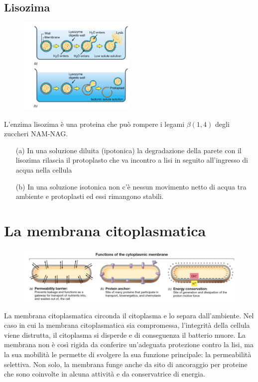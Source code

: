 \subsection{Lisozima}
\begin{multicols}{2}
\begin{figure}[H]
	\includegraphics[width=0.5\textwidth]{Pictures/7.png}
\end{figure} 
L’enzima lisozima è una proteina che può rompere i legami $\beta(1, 4)$ degli zuccheri NAM-NAG.
\begin{itemize}
\item[(a)] In una soluzione diluita (ipotonica) la degradazione della parete con il lisozima rilascia il protoplasto che va incontro a lisi in seguito 
all’ingresso di acqua nella cellula
\item[(b)] In una soluzione isotonica non c’è nessun movimento netto di acqua tra ambiente e protoplasti ed essi rimangono stabili.
\end{itemize}
\end{multicols}
\section{La membrana citoplasmatica}
\begin{figure}[H]
	\includegraphics[width=\textwidth]{Pictures/8.png}
\end{figure}
La membrana citoplasmatica circonda il citoplasma e lo separa dall’ambiente. Nel caso in cui la membrana citoplasmatica sia compromessa, l’integrità della 
cellula viene distrutta, il citoplasma si disperde e di conseguenza il batterio muore. La membrana non è così rigida da conferire un’adeguata protezione 
contro la lisi, ma la sua mobilità le permette di svolgere la sua funzione principale: la permeabilità selettiva. Non solo, la membrana funge 
anche da sito di ancoraggio per proteine che sono coinvolte in alcuna attività e da conservatrice di energia.
